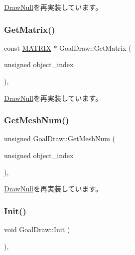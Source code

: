 \mbox{\hyperlink{class_draw_null_a84969d22d3436986f214e9896fe44fc6}{Draw\+Null}}を再実装しています。

\mbox{\label{class_goal_draw_a50fa9ceaaecdff9910e0f91e65ad9e95}} 
\subsubsection{\texorpdfstring{Get\+Matrix()}{GetMatrix()}}
{\footnotesize\ttfamily const \mbox{\hyperlink{_vector3_d_8h_a032295cd9fb1b711757c90667278e744}{M\+A\+T\+R\+IX}} $\ast$ Goal\+Draw\+::\+Get\+Matrix (\begin{DoxyParamCaption}\item[{unsigned}]{object\+\_\+index }\end{DoxyParamCaption})\hspace{0.3cm}{\ttfamily [override]}, {\ttfamily [virtual]}}



\mbox{\hyperlink{class_draw_null_adede079e9c11a756090740b20bb43022}{Draw\+Null}}を再実装しています。

\mbox{\label{class_goal_draw_a7f30c7a4325668eebd8730ad2bea1ad8}} 
\subsubsection{\texorpdfstring{Get\+Mesh\+Num()}{GetMeshNum()}}
{\footnotesize\ttfamily unsigned Goal\+Draw\+::\+Get\+Mesh\+Num (\begin{DoxyParamCaption}\item[{unsigned}]{object\+\_\+index }\end{DoxyParamCaption})\hspace{0.3cm}{\ttfamily [override]}, {\ttfamily [virtual]}}



\mbox{\hyperlink{class_draw_null_ad735978a85a5f3583eecd82d6bfe6413}{Draw\+Null}}を再実装しています。

\mbox{\label{class_goal_draw_a3eb0a555fa2db9d2c1253018ea65796e}} 
\subsubsection{\texorpdfstring{Init()}{Init()}}
{\footnotesize\ttfamily void Goal\+Draw\+::\+Init (\begin{DoxyParamCaption}{ }\end{DoxyParamCaption})\hspace{0.3cm}{\ttfamily [override]}, {\ttfamily [virtual]}}




